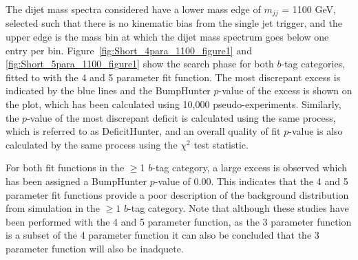 The dijet mass spectra considered have a lower mass edge of $m_{jj}$ = 1100 GeV,
selected such that there is no kinematic bias from the single jet trigger,
and the upper edge is the mass bin at which the dijet mass spectrum goes below one entry per bin.
Figure~\ref{fig:Short_4para_1100_figure1} and \ref{fig:Short_5para_1100_figure1} show the search phase
for both $b$-tag categories, fitted to with the 4 and 5 parameter fit function.
The most discrepant excess is indicated by the blue lines and the BumpHunter $p$-value of the excess is shown on the plot,
which has been calculated using 10,000 pseudo-experiments.
Similarly, the $p$-value of the most discrepant deficit is calculated using the same process, which is referred to as DeficitHunter,
and an overall quality of fit $p$-value is also calculated by the same process using the $\chi^{2}$ test statistic.

For both fit functions in the $\geq$1 $b$-tag category,
a large excess is observed which has been assigned a BumpHunter $p$-value of 0.00.
This indicates that the 4 and 5 parameter fit functions
provide a poor description of the background distribution from simulation
in the $\geq1$ $b$-tag category.
Note that although these studies have been performed with the 4 and 5 parameter function,
as the 3 parameter function is a subset of the 4 parameter function it can also be concluded
that the 3 parameter function will also be inadquete.

